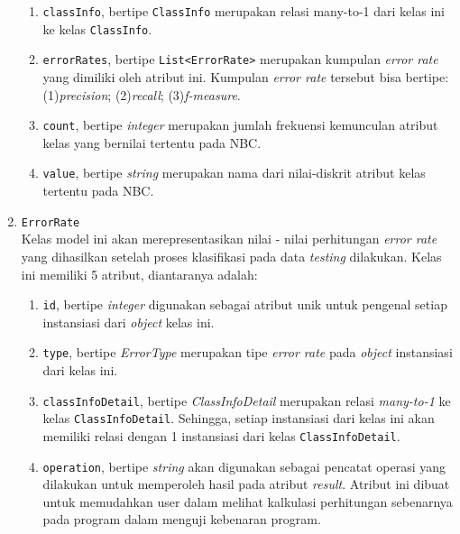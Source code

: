 \begin{enumerate}
\begin{enumerate}
		\item \texttt{classInfo}, bertipe \texttt{ClassInfo} merupakan relasi many-to-1 dari kelas ini ke kelas \texttt{ClassInfo}.
		
		\item \texttt{errorRates}, bertipe \texttt{List<ErrorRate>} merupakan kumpulan \textit{error rate} yang dimiliki oleh atribut ini. Kumpulan \textit{error rate} tersebut bisa bertipe: (1)\textit{precision}; (2)\textit{recall}; (3)\textit{f-measure}.
				
		\item \texttt{count}, bertipe \textit{integer} merupakan jumlah frekuensi kemunculan atribut kelas yang bernilai tertentu pada NBC.

		\item \texttt{value}, bertipe \textit{string} merupakan nama dari nilai-diskrit atribut kelas tertentu pada NBC.
		
	\end{enumerate}

	\item \texttt{ErrorRate}\\
	Kelas model ini akan merepresentasikan nilai - nilai perhitungan \textit{error rate} yang dihasilkan setelah proses klasifikasi pada data \textit{testing} dilakukan. Kelas ini memiliki 5 atribut, diantaranya adalah:
	\begin{enumerate}
		\item \texttt{id}, bertipe \textit{integer} digunakan sebagai atribut unik untuk pengenal setiap instansiasi dari \textit{object} kelas ini.
		
		\item \texttt{type}, bertipe \textit{ErrorType} merupakan tipe \textit{error rate} pada \textit{object} instansiasi dari kelas ini. 
		
		\item \texttt{classInfoDetail}, bertipe \textit{ClassInfoDetail} merupakan relasi \textit{many-to-1} ke kelas \texttt{ClassInfoDetail}. Sehingga, setiap instansiasi dari kelas ini akan memiliki relasi dengan 1 instansiasi dari kelas \texttt{ClassInfoDetail}.
		
		\item \texttt{operation}, bertipe \textit{string} akan digunakan sebagai pencatat operasi yang dilakukan untuk memperoleh hasil pada atribut \textit{result}. Atribut ini dibuat untuk memudahkan user dalam melihat kalkulasi perhitungan sebenarnya pada program dalam menguji kebenaran program.
		

\end{enumerate}
\end{enumerate}
